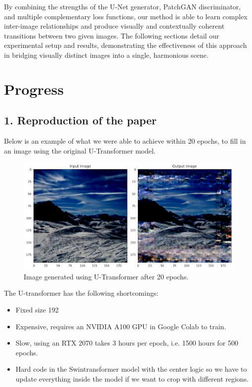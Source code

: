 \documentclass[sigconf]{acmart}
\begin{document}
By combining the strengths of the U-Net generator, PatchGAN discriminator, and multiple complementary loss functions, our method is able to learn complex inter-image relationships and produce visually and contextually coherent transitions between two given images. The following sections detail our experimental setup and results, demonstrating the effectiveness of this approach in bridging visually distinct images into a single, harmonious scene.

\section*{Progress}

\subsection*{1. Reproduction of the paper}
Below is an example of what we were able to achieve within 20 epochs, to fill in an image using the original U-Transformer model. 

\begin{figure}[h]
    \centering
    \includegraphics[width=0.8\linewidth]{utransformer.png}
    \caption{Image generated using U-Transformer after 20 epochs.}
\end{figure}

The U-transformer has the following shortcomings:
\begin{itemize}
    \item Fixed size 192
    \item Expensive, requires an NVIDIA A100 GPU in Google Colab to train.
    \item Slow, using an RTX 2070 takes 3 hours per epoch, i.e. 1500 hours for 500 epochs.
    \item Hard code in the Swintransformer model with the center logic so we have to update everything inside the model if we want to crop with different regions.
\end{itemize}
\end{document}
